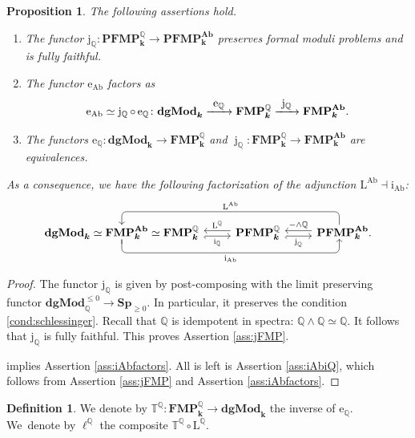 \documentclass[JEP,XML,SOM,Unicode,NoEqCountersInSection]{cedram}
\let\autoref\Cref
\newcommand{\To}[1]{\mathchoice{\xrightarrow{\textstyle\kern4pt#1\kern3pt}}{\stackrel{#1}{\longrightarrow}}{}{}}
\newenvironment{assertions}
{\bgroup\def\theenumi{\alph{enumi}}\begin{enumerate}}
{\end{enumerate}\egroup}
\newcounter{condition}
\newtheorem{prop}[thm]{Proposition}
\theoremstyle{definition}
\newtheorem{df}[thm]{Definition}
\newcommand{\Q}{\mathbb{Q}}
\newcommand{\T}{\mathbb{T}}
\newcommand{\Sp}{\mathbf{Sp}}
\newcommand{\dgMod}{\mathbf{dgMod}}
\newcommand{\FMP}{\mathbf{FMP}}
\newcommand{\Ab}{\mathbf{Ab}}
\renewcommand{\k}{{\boldsymbol{k}}}
\newcommand{\eAb}{\operatorname{e_{Ab}}}
\newcommand{\eQ}{\operatorname{e_\Q}}
\newcommand{\iAb}{\operatorname{i_{Ab}}}
\newcommand{\iQ}{\operatorname{i_{\Q}}}
\newcommand{\jQ}{\operatorname{j_\Q}}
\newcommand{\ellQ}{\operatorname{\ell^\Q}}
\newcommand{\TQ}{\operatorname{\T^\Q}}
\newcommand{\LAb}{\operatorname{L^{Ab}}}
\newcommand{\LQ}{\operatorname{L^{\Q}}}
\newcommand{\PFMP}{\mathbf{PFMP}}
\begin{document}
\begin{prop}\label{prop:fmpQ}
The following assertions hold.
\begin{assertions}
\item\label{ass:jFMP} The functor $\jQ \colon \PFMP^\Q_\k \to \PFMP_\k^\Ab$ preserves formal moduli problems and is fully faithful.
\item\label{ass:iAbfactors} The functor $\eAb$ factors as
\[
\eAb \simeq \jQ \circ \eQ \colon \dgMod_\k \To{\eQ} \FMP_\k^\Q \To\jQ \FMP_\k^\Ab.
\]
\item\label{ass:iAbiQ}
The functors $\eQ \colon \dgMod_\k \to \FMP^\Q_\k$ and $\operatorname j_\Q \colon \FMP^\Q_\k \to \FMP^\Ab_\k$ are equivalences.
\end{assertions}
As a consequence, we have the following factorization of the adjunction $\LAb \dashv \iAb$:
\[\label{eq:eAb}
\begin{tikzcd}
\dgMod_\k \simeq \FMP^\Ab_\k \simeq \FMP_\k^\Q
\arrow[rr, "\iAb", rounded corners, to path={
-- (\tikztostart.south)
|- ([yshift=-2ex, xshift=-1ex]\tikztotarget.south) [swap,near end]\tikztonodes
-- ([yshift=0.9ex, xshift=-1ex]\tikztotarget.south)}]
\ar[shift right, hook']{r}[swap]{\iQ}
\ar[shift left, leftarrow]{r}{\LQ}
& \PFMP_\k^\Q
\ar[shift right, hook']{r}[swap]{\operatorname j_\Q}
\ar[shift left, leftarrow]{r}{-\wedge \Q}
& \PFMP_\k^\Ab.
\arrow[ll, "\LAb", rounded corners, to path={
([xshift=-1ex, yshift=-0.7ex]\tikztostart.north)
|- ([yshift=2ex]\tikztotarget.north) [swap,near end]\tikztonodes
-- ([yshift=-0.7ex]\tikztotarget.north)}]
\end{tikzcd}
\]
\end{prop}

\begin{proof}
The functor $\jQ$ is given by post-composing with the limit preserving functor $\dgMod_\Q^{\leq 0} \to \Sp_{\geq 0}$. In particular, it preserves the condition \eqref{cond:schlessinger}. Recall that $\Q$ is idempotent in spectra: $\Q \wedge \Q \simeq \Q$. It follows that $\jQ$ is fully faithful. This proves Assertion \eqref{ass:jFMP}.

\autoref{prop:calceAb} implies Assertion \eqref{ass:iAbfactors}.
All is left is Assertion \eqref{ass:iAbiQ}, which follows from Assertion \eqref{ass:jFMP} and Assertion \eqref{ass:iAbfactors}.
\end{proof}

\begin{df}
We denote by $\TQ \colon \FMP_\k^\Q \to \dgMod_\k$ the inverse of $\eQ$.
We~denote by $\ellQ$ the composite $\TQ \circ \LQ$.
\end{df}
\end{document}

